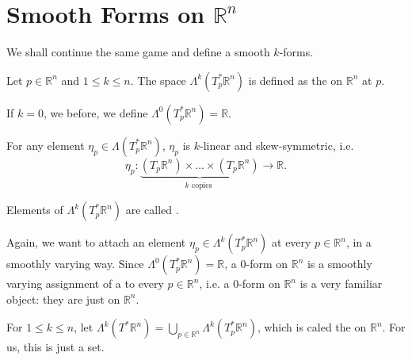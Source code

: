 \documentclass[notoc,notitlepage]{tufte-book}
\begin{document}

\section{Smooth Forms on \texorpdfstring{$\mathbb{R}^n$}{Rn}}%
\label{sec:smooth_forms_on_r_n_}

We shall continue the same game and define a smooth $k$-forms.

\begin{defn}\label{defn:space_of_k_forms_on_r_n_}
  Let $p \in \mathbb{R}^n$ and $1 \leq k \leq n$. The space $\Lambda^k(T_p^* \mathbb{R}^n)$ is
  defined as the  on $\mathbb{R}^n$ at $p$.
\end{defn}

\begin{remark}
  If $k = 0$, we before, we define $\Lambda^0 (T_p^* \mathbb{R}^n) = \mathbb{R}$.
\end{remark}

\begin{note}
  For any element $\eta_p \in \Lambda(T_p^* \mathbb{R}^n)$, $\eta_p$ is $k$-linear
  and skew-symmetric, i.e.
  \begin{equation*}
    \eta_p : \underbrace{(T_p \mathbb{R}^n) \times \hdots \times (T_p \mathbb{R}^n)
      }_{k \text{ copies }} \to \mathbb{R}.
  \end{equation*}
\end{note}

\begin{defn}[$k$-Forms at $p$]\label{defn:_k_forms_at_p_}
  Elements of $\Lambda^k(T_p^* \mathbb{R}^n)$ are called .
\end{defn}

Again, we want to attach an element $\eta_p \in \Lambda^k(T_p^* \mathbb{R}^n)$ at every $p \in
\mathbb{R}^n$, in a smoothly varying way. Since $\Lambda^0(T_p^* \mathbb{R}^n) = \mathbb{R}$,
a $0$-form on $\mathbb{R}^n$ is a smoothly varying assignment of a  to every
$p \in \mathbb{R}^n$, i.e. a $0$-form on $\mathbb{R}^n$ is a very familiar object: they are just
 on $\mathbb{R}^n$.

For $1 \leq k \leq n$, let $\Lambda^k(T^* \mathbb{R}^n) = \bigcup_{p \in \mathbb{R}^n} 
\Lambda^k(T_p^* \mathbb{R}^n)$, which is caled the  on $\mathbb{R}^n$.
For us, this is just a set.
\end{document}

